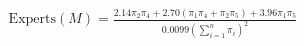 \documentclass[preview]{standalone}
\begin{document}
\begin{align*}
\text{Experts}(M)=\frac{2.14\pi_2\pi_4 + 2.70(\pi_1\pi_4 + \pi_2\pi_5)+3.96\pi_1\pi_5}{0.0099\left(\sum_{i=1}^n\pi_i\right)^2}
\end{align*}
\end{document}
